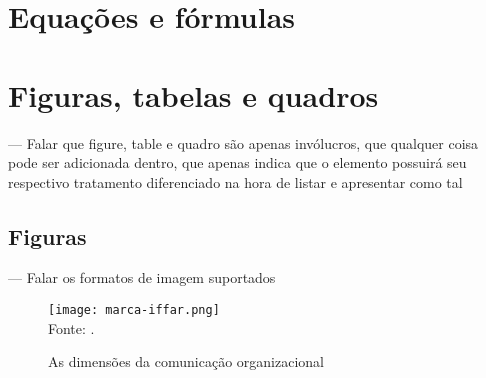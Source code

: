   \lipsum[13]


\section{Equações e fórmulas}

\section{Figuras, tabelas e quadros}
  --- Falar que figure, table e quadro são apenas invólucros, que qualquer coisa pode ser adicionada dentro, que apenas indica que o elemento possuirá seu respectivo tratamento diferenciado na hora de listar e apresentar como tal
  
\subsection{Figuras}
  --- Falar os formatos de imagem suportados
  \begin{figure}[H]
    \Centering\singlespacing
    \caption{As dimensões da comunicação organizacional}
    \label{figura:marca-iffar}
    \texttt{[image: marca-iffar.png]}\\
    \footnotesize
    Fonte: \textcite{iffar-identidade-visual-2021}.
  \end{figure}
  
